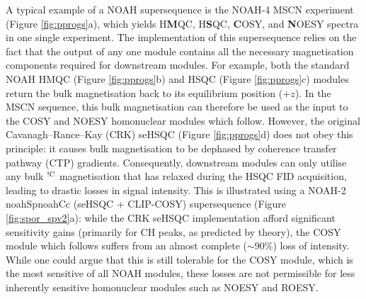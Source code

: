 \documentclass[11pt]{article}
\newcommand*{\noahtwo}[2]{\csname noah#1\endcsname\csname noah#2\endcsname}
\newcommand*{\hl}[1]{\textcolor{WildStrawberry}{#1}}
\newcommand*{\carbon}{\ce{^{13}C}}
\newcommand*{\nitrogen}{\ce{^{15}N}}
\newcommand*{\magnnot}[1]{\ce{^1H}$^{!#1}$}
\newcommand*{\figref}[1]{Figure \ref{fig:#1}}
\begin{document}
A typical example of a NOAH supersequence is the NOAH-4 MSCN experiment (\figref{pprogs}a), which yields \nitrogen{} H\textbf{M}QC, \carbon{} H\textbf{S}QC, \textbf{C}OSY, and \textbf{N}OESY spectra in one single experiment.\autocite{Kupce2017ACIE}
The implementation of this supersequence relies on the fact that the output of any one module contains all the necessary magnetisation components required for downstream modules.
For example, both the standard NOAH HMQC (\figref{pprogs}b) and HSQC (\figref{pprogs}c) modules return the bulk magnetisation back to its equilibrium position ($+z$).
In the MSCN sequence, this bulk magnetisation can therefore be used as the input to the COSY and NOESY homonuclear modules which follow.
However, the original Cavanagh--Rance--Kay (CRK) seHSQC (\figref{pprogs}d) does not obey this principle: it causes bulk magnetisation to be dephased by coherence transfer pathway (CTP) gradients.
Consequently, downstream modules can only utilise any bulk \magnnot{\ce{C}} magnetisation that has relaxed during the HSQC FID acquisition, leading to drastic losses in signal intensity.
This is illustrated using a NOAH-2 \noahtwo{Sp}{Cc} (seHSQC + CLIP-COSY\autocite{Koos2016ACIE}) supersequence (\figref{spor_spv2}a): while the CRK seHSQC implementation afford significant sensitivity gains (primarily for CH peaks, as predicted by theory\autocite{sehsqc_sens}), the COSY module which follows suffers from an almost complete ($\sim 90\%$) loss of intensity.
\hl{While one could argue that this is still tolerable for the COSY module, which is the most sensitive of all NOAH modules, these losses are not permissible for less inherently sensitive homonuclear modules such as NOESY and ROESY.}
\end{document}
